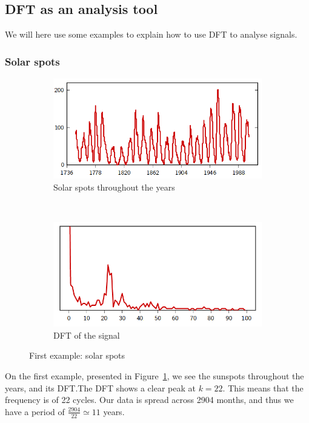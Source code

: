 \documentclass[11pt,a4paper]{article}
\begin{document}
\subsection{DFT as an analysis tool}
We will here use some examples to explain how to use DFT to analyse signals.
\subsubsection{Solar spots}
\begin{figure}[h]
    \centering
    \begin{subfigure}{1\textwidth}
        \centering%
        \includegraphics[scale=0.5]{images/solarSpots}%
        \caption{Solar spots throughout the years}%
    \end{subfigure}\\
    \begin{subfigure}{1\textwidth}%
        \centering%
        \includegraphics[scale=0.5]{images/solarSpots_dft}%
        \caption{DFT of the signal}%
    \end{subfigure}%
    \caption{First example: solar spots}%
    \label{figs:solar spots}%
\end{figure}
On the first example, presented in Figure\ \ref{figs:solar spots}, we see the sunspots throughout the years, and its DFT.\@ The DFT shows a clear peak at $k=22$. This means that the frequency is of 22 cycles. Our data is spread across 2904 months, and thus we have a period of $\frac{2904}{22} \simeq 11$ years.
\end{document}
